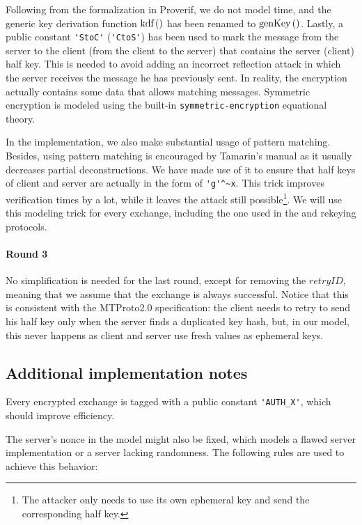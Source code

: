 Following from the formalization in Proverif, we do not model time, and the generic key derivation function $\mbox{kdf}\left(\right)$ has been renamed to $\mbox{genKey}\left(\right)$. Lastly, a public constant \lstinline{'StoC'} (\lstinline{'CtoS'}) has been used to mark the message from the server to the client (from the client to the server) that contains the server (client) \DiHe{} half key. This is needed to avoid adding an incorrect reflection attack in which the server receives the message he has previously sent. In reality, the encryption actually contains some data that allows matching messages. Symmetric encryption is modeled using the built-in \lstinline{symmetric-encryption} equational theory.

\lstset{language=tamarin}
In the implementation, we also make substantial usage of pattern matching. Besides, using pattern matching is encouraged by Tamarin's manual as it usually decreases partial deconstructions. We have made use of it to ensure that half keys of client and server are actually in the form of \lstinline{'g'^~x}. This trick improves verification times by a lot, while it leaves the \mitm{} attack still possible\footnote{The attacker only needs to use its own ephemeral key and send the corresponding half key.}. We will use this modeling trick for every \DiHe{} exchange, including the one used in the \schat{} and rekeying protocols.

\paragraph{Round 3} No simplification is needed for the last round, except for removing the $retryID$, meaning that we assume that the exchange is always successful. Notice that this is consistent with the MTProto2.0 specification: the client needs to retry to send his half key only when the server finds a duplicated key hash, but, in our model, this never happens as client and server use fresh values as \DiHe{} ephemeral keys.

\subsection{Additional implementation notes}
Every encrypted exchange is tagged with a public constant \lstinline{'AUTH_X'}, which should improve efficiency.

The server's nonce in the model might also be fixed, which models a flawed server implementation or a server lacking randomness. The following rules are used to achieve this behavior:


